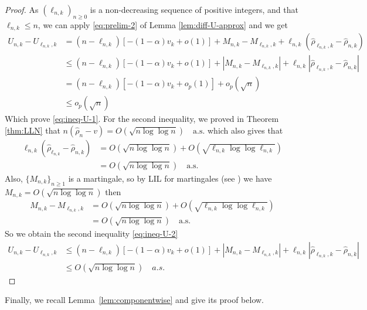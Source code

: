 \begin{proof}
	As \(\left(\ell_{n,k}\right)_{n \geq 0}\) is a non-decreasing sequence of positive integers, and that \(\ell_{n,k} \leq n\), we can apply \eqref{eq:prelim-2} of Lemma \ref{lem:diff-U-approx} and we get
	\begin{align*}
		U_{n,k} - U_{\ell_{n,k},k} &= (n - \ell_{n,k})[-(1 - \alpha)v_k + o(1)] + M_{n,k} - M_{\ell_{n,k},k} + \ell_{n,k} (\hat{\rho}_{\ell_{n,k},k} - \hat{\rho}_{n,k})\\
		&\leq (n - \ell_{n,k})[-(1 - \alpha)v_k + o(1)] + |M_{n,k} - M_{\ell_{n,k},k}| + \ell_{n,k} |\hat{\rho}_{\ell_{n,k},k} - \hat{\rho}_{n,k}|\\
		&= (n - \ell_{n,k})[-(1 - \alpha)v_k + o_p(1)] + o_p(\sqrt{n})\\
		&\leq o_p(\sqrt{n}) 
	\end{align*}
	Which prove \eqref{eq:ineq-U-1}. For the second inequality, we proved in Theorem \ref{thm:LLN} that \(n(\hat{\rho}_n - v) = O\left(\sqrt{n \log \log n}\right) \quad \text{a.s.}\) which also gives that
	\begin{align*}
		\ell_{n,k}(\hat{\rho}_{\ell_{n,k}} - \hat{\rho}_{n,k}) &= O\left(\sqrt{n \log \log n}\right) + O\left(\sqrt{\ell_{n,k} \log \log \ell_{n,k}}\right) \\
		&= O\left(\sqrt{n \log \log n}\right) \quad \text{a.s.}
	\end{align*}
	Also, $\{M_{n,k}\}_{n \geq 1}$ is a martingale, so by LIL for martingales (see \cite{Stout1970}) we have \(M_{n,k} = O\left(\sqrt{n \log\!\log n}\right)\) then
	\begin{align*}
		M_{n,k} - M_{\ell_{n,k},k} &= O\left(\sqrt{n \log\!\log n}\right) + O\left(\sqrt{\ell_{n,k} \log\!\log \ell_{n,k}}\right)\\
		&= O\left(\sqrt{n \log\!\log n}\right) \quad \text{a.s.}
	\end{align*}
	So we obtain the second inequality \eqref{eq:ineq-U-2}
	\begin{align*}
		U_{n,k} - U_{\ell_{n,k},k} &\leq (n - \ell_{n,k})[-(1 - \alpha)v_k + o(1)] + |M_{n,k} - M_{\ell_{n,k},k}| + \ell_{n,k} |\hat{\rho}_{\ell_{n,k},k} - \hat{\rho}_{n,k}|\\			
		&\leq O\left(\sqrt{n \log \log n}\right) \quad a.s.
	\end{align*}
\end{proof}

Finally, we recall Lemma~\ref{lem:componentwise} and give its proof below.

